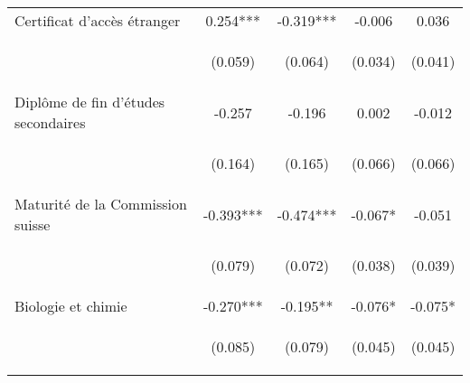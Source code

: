 \begin{center}
\begin{tabular}{lcccc}
Certificat d'accès étranger & 0.254*** & -0.319*** & -0.006 & 0.036 \\
\vspace{4pt} & \begin{footnotesize}(0.059)\end{footnotesize} & \begin{footnotesize}(0.064)\end{footnotesize} & \begin{footnotesize}(0.034)\end{footnotesize} & \begin{footnotesize}(0.041)\end{footnotesize} \\
Diplôme de fin d'études secondaires & -0.257 & -0.196 & 0.002 & -0.012 \\
\vspace{4pt} & \begin{footnotesize}(0.164)\end{footnotesize} & \begin{footnotesize}(0.165)\end{footnotesize} & \begin{footnotesize}(0.066)\end{footnotesize} & \begin{footnotesize}(0.066)\end{footnotesize} \\
Maturité de la Commission suisse & -0.393*** & -0.474*** & -0.067* & -0.051 \\
\vspace{4pt} & \begin{footnotesize}(0.079)\end{footnotesize} & \begin{footnotesize}(0.072)\end{footnotesize} & \begin{footnotesize}(0.038)\end{footnotesize} & \begin{footnotesize}(0.039)\end{footnotesize} \\
Biologie et chimie & -0.270*** & -0.195** & -0.076* & -0.075* \\
\vspace{4pt} & \begin{footnotesize}(0.085)\end{footnotesize} & \begin{footnotesize}(0.079)\end{footnotesize} & \begin{footnotesize}(0.045)\end{footnotesize} & \begin{footnotesize}(0.045)\end{footnotesize} \\

\end{tabular}
\end{center}

